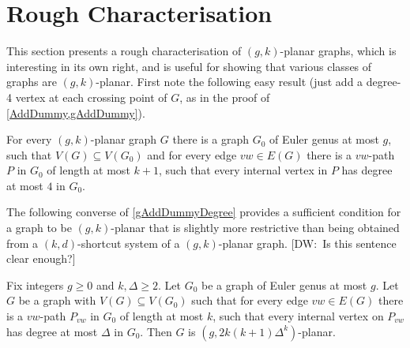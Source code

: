 \documentclass{patmorin}
\newcommand{\note}[2]{{\color{red}[#1:~#2]}}
\newcommand{\PP}{\mathcal{P}}
\renewcommand{\geq}{\geqslant}
\begin{document}
\section{Rough Characterisation}
\label{Characterisation}

This section presents a rough characterisation of $(g,k)$-planar graphs, which is interesting in its own right, and is useful for showing that various classes of graphs are $(g,k)$-planar. First note the following easy result (just add a degree-4 vertex at each crossing point of $G$, as in the proof of \cref{AddDummy,gAddDummy}). 

\begin{lem}
\label{gAddDummyDegree}
For every $(g,k)$-planar graph $G$ there is a graph $G_0$ of Euler
genus at most $g$, such that $V(G) \subseteq V(G_0)$ and for every
edge $vw \in E(G)$ there is a $vw$-path $P$ in $G_0$ of length at most
$k+1$, such that every internal vertex in $P$ has degree at most $4$
in $G_0$.
\end{lem}



The following converse of \cref{gAddDummyDegree} provides a sufficient condition for a graph to be $(g,k)$-planar that is slightly more restrictive than being obtained from a $(k,d)$-shortcut system of a $(g,k)$-planar graph. \note{DW}{Is this sentence clear enough?}

\begin{lem} 
\label{DrawG}
Fix integers $g\geq 0$ and $k,\Delta\geq 2$. 
Let $G_0$ be a graph of Euler genus at most $g$. Let $G$ be
a graph with $V(G) \subseteq V(G_0)$ such that for every edge $vw \in
E(G)$ there is a $vw$-path $P_{vw}$ in $G_0$ of length at most $k$, such
that every internal vertex on $P_{vw}$ has degree at most $\Delta$ in
$G_0$. Then $G$ is $(g, 2k(k+1)\Delta^{k} )$-planar.
\end{lem}
\end{document}
